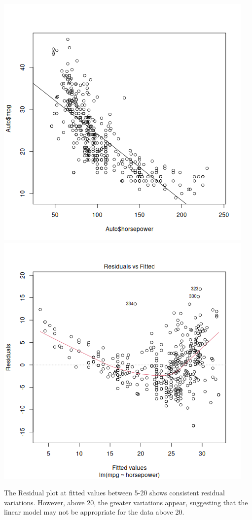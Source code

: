 \documentclass{article}
\begin{document}
\includegraphics[scale=0.5]{q8.png}
\includegraphics[scale=0.5]{q8_2.png}

The Residual plot at fitted values between 5-20 shows consistent residual variations. However, above 20, the greater variations appear, suggesting that the linear model may not be appropriate for the data above 20.
\newpage
\end{document}
